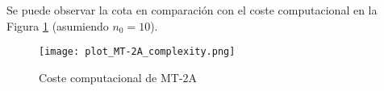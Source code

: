 Se puede observar la cota en comparación con el coste computacional en la Figura \ref{fig:MT-2A_plot} (asumiendo $n_0 = 10$).

\begin{figure}[h]
    \centering
    \texttt{[image: plot\_MT-2A\_complexity.png]}
    \caption{Coste computacional de MT-2A}
    \label{fig:MT-2A_plot}
\end{figure}
